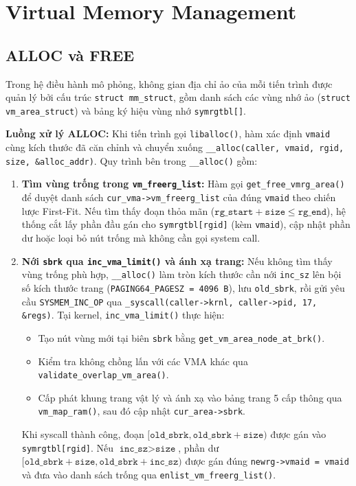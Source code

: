 \documentclass[12pt,a4paper]{article}
\begin{document}
    \section{Virtual Memory Management}
    \subsection{ALLOC và FREE}
    
    Trong hệ điều hành mô phỏng, không gian địa chỉ ảo của mỗi tiến trình được quản lý bởi cấu trúc \texttt{struct mm\_struct}, gồm danh sách các vùng nhớ ảo (\texttt{struct vm\_area\_struct}) và bảng ký hiệu vùng nhớ \texttt{symrgtbl[]}.
    
    \noindent\textbf{Luồng xử lý ALLOC:}
    Khi tiến trình gọi \texttt{liballoc()}, hàm xác định \texttt{vmaid} cùng kích thước đã căn chỉnh và chuyển xuống \texttt{\_\_alloc(caller, vmaid, rgid, size, \&alloc\_addr)}. Quy trình bên trong \texttt{\_\_alloc()} gồm:
    \begin{enumerate}
        \item \textbf{Tìm vùng trống trong \texttt{vm\_freerg\_list}:} Hàm gọi \texttt{get\_free\_vmrg\_area()} để duyệt danh sách \texttt{cur\_vma->vm\_freerg\_list} của đúng \texttt{vmaid} theo chiến lược First-Fit. Nếu tìm thấy đoạn thỏa mãn ($\texttt{rg\_start} + \texttt{size} \le \texttt{rg\_end}$), hệ thống cắt lấy phần đầu gán cho \texttt{symrgtbl[rgid]} (kèm \texttt{vmaid}), cập nhật phần dư hoặc loại bỏ nút trống mà không cần gọi system call.
        \item \textbf{Nới \texttt{sbrk} qua \texttt{inc\_vma\_limit()} và ánh xạ trang:} Nếu không tìm thấy vùng trống phù hợp, \texttt{\_\_alloc()} làm tròn kích thước cần nới \texttt{inc\_sz} lên bội số kích thước trang (\texttt{PAGING64\_PAGESZ = 4096 B}), lưu \texttt{old\_sbrk}, rồi gửi yêu cầu \texttt{SYSMEM\_INC\_OP} qua \texttt{\_syscall(caller->krnl, caller->pid, 17, \&regs)}. Tại kernel, \texttt{inc\_vma\_limit()} thực hiện:
        \begin{itemize}
            \item Tạo nút vùng mới tại biên \texttt{sbrk} bằng \texttt{get\_vm\_area\_node\_at\_brk()}.
            \item Kiểm tra không chồng lấn với các VMA khác qua \texttt{validate\_overlap\_vm\_area()}.
            \item Cấp phát khung trang vật lý và ánh xạ vào bảng trang 5 cấp thông qua \texttt{vm\_map\_ram()}, sau đó cập nhật \texttt{cur\_area->sbrk}.
        \end{itemize}
        Khi syscall thành công, đoạn $[\texttt{old\_sbrk}, \texttt{old\_sbrk} + \texttt{size})$ được gán vào \texttt{symrgtbl[rgid]}. Nếu $\texttt{inc\_sz} > \texttt{size}$, phần dư $[\texttt{old\_sbrk} + \texttt{size}, \texttt{old\_sbrk} + \texttt{inc\_sz})$ được gán đúng \texttt{newrg->vmaid = vmaid} và đưa vào danh sách trống qua \texttt{enlist\_vm\_freerg\_list()}.
    \end{enumerate}
    
\end{document}
